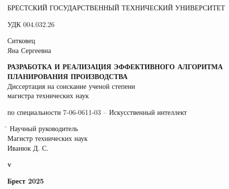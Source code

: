 \begin{titlepage}

    \begin{center} \bfseries
        \bigskip
        \medskip

        {БРЕСТСКИЙ ГОСУДАРСТВЕННЫЙ ТЕХНИЧЕСКИЙ УНИВЕРСИТЕТ}
    \end{center}
    \vspace{1cm}

    \noindent УДК 004.032.26 \\
    \vspace{1cm}

    \begin{center}
        {Ситковец \\ Яна Сергеевна}\\
        \vspace{1cm}

        {\bfseries РАЗРАБОТКА И РЕАЛИЗАЦИЯ ЭФФЕКТИВНОГО АЛГОРИТМА ПЛАНИРОВАНИЯ ПРОИЗВОДСТВА}\\
        \vspace{2cm}
        Диссертация на соискание ученой степени\\
        магистра технических наук\\
        \bigskip

        по специальности 7-06-0611-03 -- Искусственный интеллект
    \end{center}
    \vspace{3cm}

    \begin{tabbing}
        \hspace{8cm} \= \kill \>
        Научный руководитель \+ \\
        Магистр технических наук \\
        Иванюк Д. С.
    \end{tabbing}


    \ifdefined\dissertationversion
        \vspace{3cm}
        \begin{center}
            \bfseries v\dissertationversion
        \end{center}
        \vspace{3cm}
    \else
        \vspace{5cm}
    \fi

    \begin{center}
        \bfseries Брест 2025
    \end{center}

\end{titlepage}
